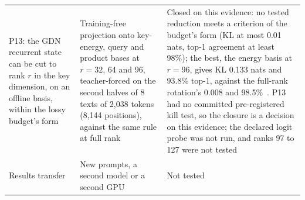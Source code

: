 {\begin{longtable}{@{}P{5.2cm}P{4.6cm}P{6.5cm}@{}}
P13: the GDN recurrent state can be cut to rank $r$ in the key dimension, on an offline basis, within the lossy budget's form & Training-free projection onto key-energy, query and product bases at $r=32$, 64 and 96, teacher-forced on the second halves of 8 texts of 2,038 tokens (8,144 positions), against the same rule at full rank & Closed on this evidence: no tested reduction meets a criterion of the budget's form (KL at most 0.01 nats, top-1 agreement at least 98\%); the best, the energy basis at $r=96$, gives KL 0.133 nats and 93.8\% top-1, against the full-rank rotation's 0.008 and 98.5\%~. P13 had no committed pre-registered kill test, so the closure is a decision on this evidence; the declared logit probe was not run, and ranks 97 to 127 were not tested\\
Results transfer & New prompts, a second model or a second GPU & Not tested\\
\end{longtable}}

